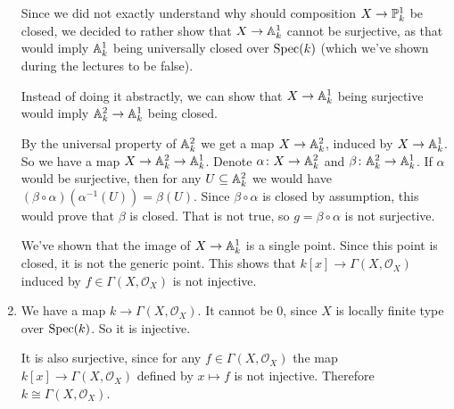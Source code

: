 \begin{exercise}{3}
\begin{enumerate}
{                Since we did not exactly understand why should composition $X
                \to \mathbb{P}^1_k$ be closed, we decided to rather show that $X \to
                \mathbb{A}^1_k$ cannot be surjective, as that would imply $\mathbb{A}^1_k$
                being universally closed over $\operatorname{Spec}(k)$ (which we've shown
                during the lectures to be false). 

                Instead of doing it abstractly, we can show that $X \to
                \mathbb{A}^1_k$ being surjective would imply $\mathbb{A}^2_k \to \mathbb{A}^1_k$
                being closed.

                By the universal property of $\mathbb{A}^2_k$ we get a map $X \to
                \mathbb{A}^2_k$, induced by $X \to \mathbb{A}^1_k$.
                So we have a map $X \to \mathbb{A}^2_k \to \mathbb{A}^1_k$.
                Denote $\alpha \colon X \to \mathbb{A}^2_k$ and $\beta \colon \mathbb{A}^2_k
                \to \mathbb{A}^1_k$.
                If $\alpha$ would be surjective, then for any $U \subseteq
                \mathbb{A}^2_k$ we would have $(\beta \circ \alpha)(\alpha^{-1}(U)) =
                \beta(U)$. Since $\beta \circ \alpha$ is closed by assumption,
                this would prove that $\beta$ is closed. That is not true, so
                $g = \beta \circ \alpha$ is not surjective.

                We've shown that the image of $X \to \mathbb{A}^1_k$ is a single
                point. Since this point is closed, it is not the generic point.
                This shows that $k[x] \to \Gamma(X, \mathcal{O}_X)$ induced by
                $f \in \Gamma(X, \mathcal{O}_X)$ is not injective.
            }
        \item{
                We have a map $k \to \Gamma(X, \mathcal{O}_X)$. It cannot be
                $0$, since $X$ is locally finite type over $\operatorname{Spec}(k)$. So it is
                injective.

                It is also surjective, since for any $f \in \Gamma(X,
                \mathcal{O}_X)$ the map $k[x] \to \Gamma(X, \mathcal{O}_X)$
                defined by $x \mapsto f$ is not injective. Therefore $k \cong
                \Gamma(X, \mathcal{O}_X)$.
            }
    \end{enumerate}
\end{exercise}
